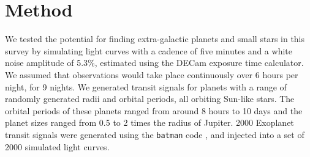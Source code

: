 
\section{Method}

We tested the potential for finding extra-galactic planets and small stars in
this survey by simulating light curves with a cadence of five minutes and a
white noise amplitude of 5.3\%, estimated using the DECam exposure time
calculator.
We assumed that observations would take place continuously over 6 hours per
night, for 9 nights.
We generated transit signals for planets with a range of randomly generated
radii and orbital periods, all orbiting Sun-like stars.
The orbital periods of these planets ranged from around 8 hours to 10 days and
the planet sizes ranged from 0.5 to 2 times the radius of Jupiter.
2000 Exoplanet transit signals were generated using the {\tt batman} code
\citep{kreidberg2015}, and injected into a set of 2000 simulated light curves.

